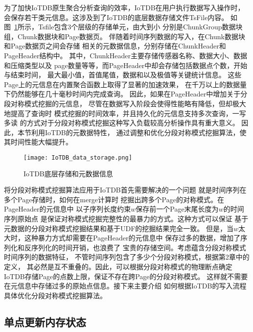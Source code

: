 为了加快IoTDB原生聚合分析查询的效率，IoTDB在用户执行数据写入操作时，
会保存若干类元信息。这涉及到了IoTDB的底层数据存储文件TsFile内容。
如图~\ref{fig:iotdb}所示，Tsfile包含3个层级的存储单元，由大到小
分别是ChunkGroup数据块组，Chunk数据块和Page数据页。
伴随着时间序列数据的写入，在Chunk数据块和Page数据页之间会存储
相关的元数据信息，分别存储在ChunkHeader和PageHeader结构中。
其中，ChunkHeader主要存储传感器名称、数据大小、数据和压缩类型以及
page数量等等，而PageHeader中却会存储包括数据点个数，开始与结束时间，
最大最小值，首值尾值，数据和以及极值等关键统计信息。
这些Page上的元信息在内置聚合函数上取得了显著的加速效果，
在千万以上的数据量下仍然能够在几十毫秒时间内完成查询。
因此，如果在PageHeader中增加关于分段对称模式挖掘的元信息，
尽管在数据写入阶段会使得性能略有降低，但却极大地提高了查询时
模式挖掘的时间效率，并且持久化的元信息支持多次查询，一写多读
的方式对于分段对称模式挖掘这种写入负载较高分析操作具有重大意义。
因此，本节利用IoTDB的元数据特性，
通过调整和优化分段对称模式挖掘算法，使其时间性能大幅提升。
\begin{figure}
  \centering
  \texttt{[image: IoTDB\_data\_storage.png]}
  \caption{IoTDB底层存储和元数据信息}
  \label{fig:iotdb}
\end{figure}

将分段对称模式挖掘算法应用于IoTDB首先需要解决的一个问题
就是时间序列在多个Page存储时，如何在merge计算时
挖掘出跨多个Page的对称模式。在PageHeader的元信息中
以子序列长度约束$w$保存前一个Page末尾长度为$w$的时间序列原始点
是保证对称模式挖掘完整性的最暴力的方式。这种方式可以保证
基于元数据的分段对称模式挖掘结果和基于UDF的挖掘结果完全一致。
但是，当$w$太大时，这种暴力方式却需要在PageHeader的元信息中
保存过多的数据，增加了序列化和反序列化的时间开销，也浪费了
宝贵的存储空间。考虑蕴含分段对称模式时间序列的数据特征，
不管时间序列包含了多少个分段对称模式，根据第2章中的定义，
其必然是互不重叠的。因此，可以根据分段对称模式的物理断点确定
IoTDB存储Page的点数上限，保证不存在跨Page的分段对称模式。
这样就不需要在元信息中存储过多的原始点信息。接下来主要介绍
如何根据IoTDB的写入流程具体优化分段对称模式挖掘算法。


\subsection{单点更新内存状态}

